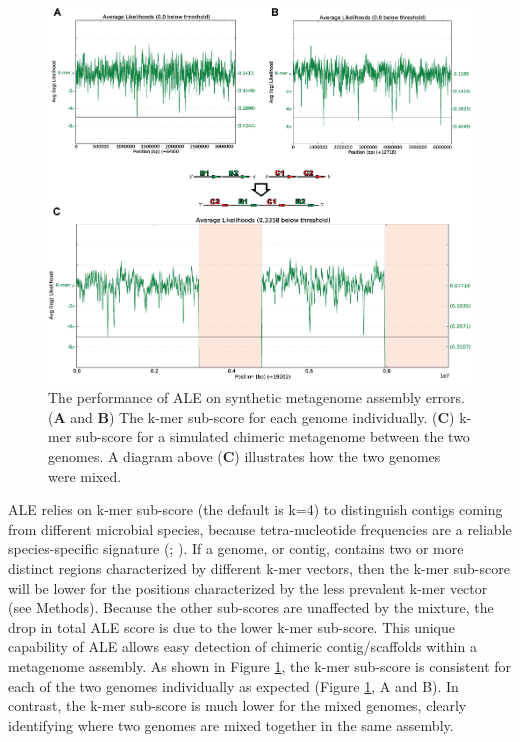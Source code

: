 \documentclass[phd,tocprelim]{cornell}
\begin{document}
\begin{figure}[!tpb]%
    \centerline{\includegraphics[width=\textwidth]{figures/ALE/Clark_Fig4b.png}}
    \caption[ALE performance on synthetic metagenome]{The performance of ALE on synthetic metagenome assembly errors. ({\bf A} and {\bf B}) The k-mer sub-score for each genome individually. ({\bf C}) k-mer sub-score for a simulated chimeric metagenome between the two genomes. A diagram above ({\bf C}) illustrates how the two genomes were mixed.}\label{ALEfig4}
\end{figure}

ALE relies on k-mer sub-score (the default is k=4) to distinguish contigs coming from different microbial species, because tetra-nucleotide frequencies are a reliable species-specific signature (\cite{Teeling2004}; \cite{Woyke2006}). If a genome, or contig, contains two or more distinct regions characterized by different k-mer vectors, then the k-mer sub-score will be lower for the positions characterized by the less prevalent k-mer vector (see Methods). Because the other sub-scores are unaffected by the mixture, the drop in total ALE score is due to the lower k-mer sub-score. This unique capability of ALE allows easy detection of chimeric contig/scaffolds within a metagenome assembly. As shown in Figure \ref{ALEfig4}, the k-mer sub-score is consistent for each of the two genomes individually as expected (Figure \ref{ALEfig4}, A and B). In contrast, the k-mer sub-score is much lower for the mixed genomes, clearly identifying where two genomes are mixed together in the same assembly.
\end{document}

